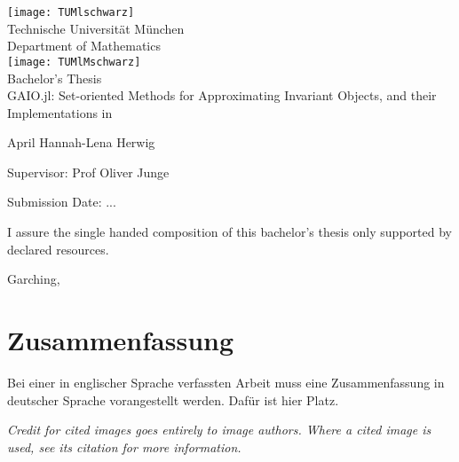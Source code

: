 \pagestyle{empty}
\begin{titlepage}
\begin{center}
\texttt{[image: TUMlschwarz]}\\[3mm]
\sf
{\Large
  Technische Universit\"at M\"unchen\\[5mm]
  Department of Mathematics\\[8mm]
}
\normalsize
\texttt{[image: TUMlMschwarz]}\\[15mm]

Bachelor's Thesis\\[15mm]

{\LARGE
  GAIO.jl: Set-oriented Methods for Approximating Invariant Objects, and their Implementations in {\Huge \julia}
}
\bigskip

\normalsize

April Hannah-Lena Herwig
\end{center}
\vspace*{75mm}

Supervisor: Prof Oliver Junge
\medskip

Submission Date: ... %

\end{titlepage}

\vspace*{150mm}

I assure the single handed composition of this bachelor's thesis only supported by declared resources.
\bigskip

Garching, %
\newpage
\section*{Zusammenfassung}
Bei einer in englischer Sprache verfassten Arbeit muss eine Zusammenfassung in deutscher Sprache vorangestellt werden.
Daf\"ur ist hier Platz.

\newpage
\tableofcontents
\vspace*{10ex}

\begin{remark}
  \textit{
      Credit for cited images goes entirely to image authors.
      Where a cited image is used, see its citation for more information.
  }
\end{remark}

\newpage
